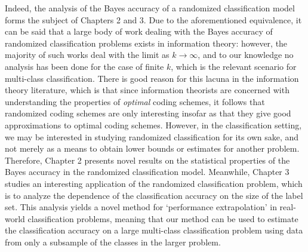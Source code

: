 Indeed, the analysis of the Bayes accuracy of a randomized
classification model forms the subject of Chapters 2 and 3.  Due to
the aforementioned equivalence, it can be said that a large body of
work dealing with the Bayes accuracy of randomized classification
problems exists in information theory: however, the majority of such
works deal with the limit as $k \to \infty$, and to our knowledge no
analysis has been done for the case of finite $k$, which is the
relevant scenario for multi-class classification.  There is good
reason for this lacuna in the information theory literature, which is
that since information theorists are concerned with understanding the
properties of \emph{optimal} coding schemes, it follows that
randomized coding schemes are only interesting insofar as that they
give good approximations to optimal coding schemes.  However, in the
classification setting, we may be interested in studying randomized
classification for its own sake, and not merely as a means to obtain
lower bounds or estimates for another problem.  Therefore, Chapter 2
presents novel results on the statistical properties of the Bayes
accuracy in the randomized classification model.  Meanwhile, Chapter 3
studies an interesting application of the randomized classification
problem, which is to analyze the dependence of the classification
accuracy on the size of the label set.  This analysis yields a novel
method for `performance extrapolation' in real-world classification
problems, meaning that our method can be used to estimate the
classification accuracy on a large multi-class classification problem
using data from only a subsample of the classes in the larger problem.











